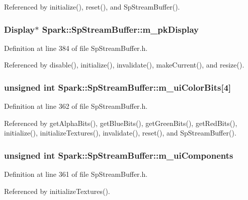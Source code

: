 Referenced by initialize(), reset(), and Sp\-Stream\-Buffer().
\subsubsection{\setlength{\rightskip}{0pt plus 5cm}Display$\ast$ {\bf Spark::Sp\-Stream\-Buffer::m\_\-pk\-Display}\hspace{0.3cm}{\tt  [protected]}}\label{classSpark_1_1SpStreamBuffer_p21}


Definition at line 384 of file Sp\-Stream\-Buffer.h.

Referenced by disable(), initialize(), invalidate(), make\-Current(), and resize().
\subsubsection{\setlength{\rightskip}{0pt plus 5cm}unsigned int {\bf Spark::Sp\-Stream\-Buffer::m\_\-ui\-Color\-Bits}[4]\hspace{0.3cm}{\tt  [protected]}}\label{classSpark_1_1SpStreamBuffer_p11}


Definition at line 362 of file Sp\-Stream\-Buffer.h.

Referenced by get\-Alpha\-Bits(), get\-Blue\-Bits(), get\-Green\-Bits(), get\-Red\-Bits(), initialize(), initialize\-Textures(), invalidate(), reset(), and Sp\-Stream\-Buffer().
\subsubsection{\setlength{\rightskip}{0pt plus 5cm}unsigned int {\bf Spark::Sp\-Stream\-Buffer::m\_\-ui\-Components}\hspace{0.3cm}{\tt  [protected]}}\label{classSpark_1_1SpStreamBuffer_p10}


Definition at line 361 of file Sp\-Stream\-Buffer.h.

Referenced by initialize\-Textures().
